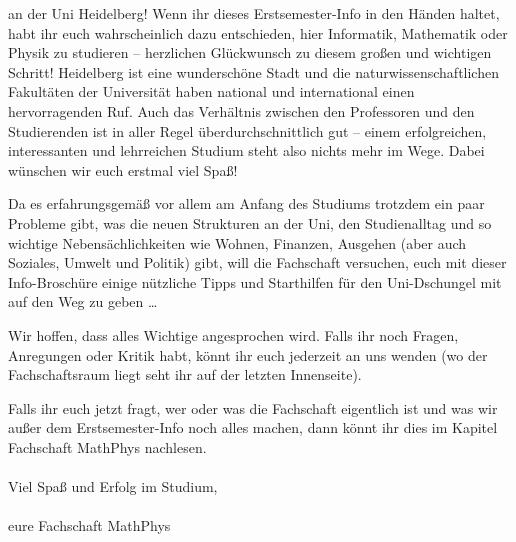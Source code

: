 an der Uni Heidelberg! Wenn ihr dieses Erstsemester-Info in den Händen haltet,
habt ihr euch wahrscheinlich dazu entschieden, hier Informatik, Mathematik
oder Physik zu studieren -- herzlichen Glückwunsch zu diesem großen und
wichtigen Schritt! Heidelberg ist eine wunderschöne Stadt und die
naturwissenschaftlichen Fakultäten der Universität haben national und
international einen hervorragenden Ruf. Auch das Verhältnis zwischen den
Professoren und den Studierenden ist in aller Regel überdurchschnittlich gut
-- einem erfolgreichen, interessanten und lehrreichen Studium steht also
nichts mehr im Wege. Dabei wünschen wir euch erstmal viel Spaß! \smiley

Da es erfahrungsgemäß vor allem am Anfang des Studiums trotzdem ein
paar Probleme gibt, was die neuen Strukturen an der Uni, den
Studienalltag und so wichtige Nebensächlichkeiten wie Wohnen,
Finanzen, Ausgehen (aber auch Soziales, Umwelt und Politik) gibt, will
die Fachschaft versuchen, euch mit dieser Info-Broschüre einige
nützliche Tipps und Starthilfen für den Uni-Dschungel mit auf den Weg
zu geben \dots


Wir hoffen, dass alles Wichtige angesprochen wird. Falls ihr noch
Fragen, Anregungen oder Kritik habt, könnt ihr euch jederzeit an uns
wenden (wo der Fachschaftsraum liegt seht ihr auf der letzten Innenseite).

Falls ihr euch jetzt fragt, wer oder was die Fachschaft eigentlich ist
und was wir außer dem Erstsemester-Info noch alles machen, dann könnt
ihr dies im Kapitel Fachschaft MathPhys nachlesen. \\\\ \noindent Viel Spaß und Erfolg
im Studium,\\\\

eure Fachschaft MathPhys
